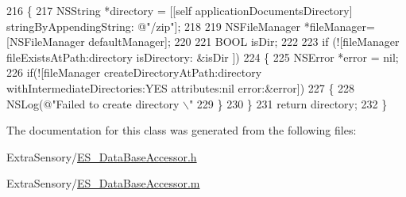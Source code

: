 \begin{DoxyCode}
216 \{
217     NSString *directory = [[\textcolor{keyword}{self} applicationDocumentsDirectory] stringByAppendingString: @"/zip"];
218     
219     NSFileManager *fileManager= [NSFileManager defaultManager];
220     
221     BOOL isDir;
222     
223     \textcolor{keywordflow}{if} (![fileManager fileExistsAtPath:directory isDirectory: &isDir ])
224     \{
225         NSError *error = nil;
226         \textcolor{keywordflow}{if}(![fileManager createDirectoryAtPath:directory withIntermediateDirectories:YES attributes:nil 
      error:&error])
227         \{
228             NSLog(\textcolor{stringliteral}{@"Failed to create directory \(\backslash\)"}%
229         \}
230     \}
231     \textcolor{keywordflow}{return} directory;
232 \}
\end{DoxyCode}


The documentation for this class was generated from the following files\+:\begin{DoxyCompactItemize}
\item 
Extra\+Sensory/\hyperlink{_e_s___data_base_accessor_8h}{E\+S\+\_\+\+Data\+Base\+Accessor.\+h}\item 
Extra\+Sensory/\hyperlink{_e_s___data_base_accessor_8m}{E\+S\+\_\+\+Data\+Base\+Accessor.\+m}\end{DoxyCompactItemize}
